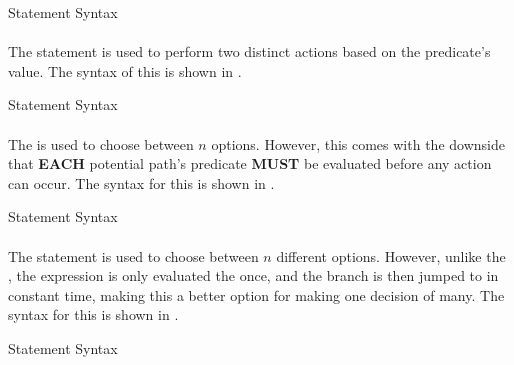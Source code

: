 \begin{listing}[h!tbp]
\caption{\texorpdfstring{}{\texttt{if}} Statement Syntax}
\label{lst:if_Statement}
\end{listing}

\paragraph{\texorpdfstring{ }{\texttt{if}-\texttt{else}}}\label{par:if_else_Statement}
The  statement is used to perform two distinct actions based on the predicate's value.
The syntax of this is shown in .

\begin{listing}[h!tbp]
\caption{\texorpdfstring{}{\texttt{if else}} Statement Syntax}
\label{lst:if_else_Statement}
\end{listing}

\paragraph{\texorpdfstring{  }{\texttt{if}-\texttt{else if}-\texttt{case}}}\label{par:if_elseif_else_Statement}
The  is used to choose between $n$ options.
However, this comes with the downside that \textbf{EACH} potential path's predicate \textbf{MUST} be evaluated before any action can occur.
The syntax for this is shown in .

\begin{listing}[h!tbp]
\caption{\texorpdfstring{}{\texttt{if else if else}} Statement Syntax}
\label{lst:if_elseif_else_Statement}
\end{listing}

\paragraph{\texorpdfstring{ }{\texttt{switch}-\texttt{case}}}\label{par:switch_case_Statement}
The  statement is used to choose between $n$ different options.
However, unlike the , the expression is only evaluated the once, and the branch is then jumped to in constant time, making this a better option for making one decision of many.
The syntax for this is shown in .

\begin{listing}[h!tbp]
\caption{\texorpdfstring{}{\texttt{switch case}} Statement Syntax}
\label{lst:switch_case_Statement}
\end{listing}


